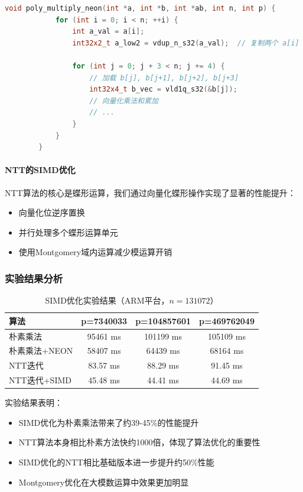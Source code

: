 \documentclass[a4paper]{article}
\begin{document}
	\begin{lstlisting}[language=C++, caption=朴素乘法SIMD优化核心代码]
		void poly_multiply_neon(int *a, int *b, int *ab, int n, int p) {
			for (int i = 0; i < n; ++i) {
				int a_val = a[i];
				int32x2_t a_low2 = vdup_n_s32(a_val);  // 复制两个 a[i]
				
				for (int j = 0; j + 3 < n; j += 4) {
					// 加载 b[j], b[j+1], b[j+2], b[j+3]
					int32x4_t b_vec = vld1q_s32(&b[j]);
					// 向量化乘法和累加
					// ...
				}
			}
		}
	\end{lstlisting}
	
	\paragraph{NTT的SIMD优化}
	NTT算法的核心是蝶形运算，我们通过向量化蝶形操作实现了显著的性能提升：
	
	\begin{itemize}
		\item 向量化位逆序置换
		\item 并行处理多个蝶形运算单元
		\item 使用Montgomery域内运算减少模运算开销
	\end{itemize}
	
	\subsubsection{实验结果分析}
	
	\begin{table}[H]
		\centering
		\caption{SIMD优化实验结果（ARM平台，$n=131072$）}
		\begin{tabular}{|l|c|c|c|}
			\hline
			\textbf{算法} & \textbf{p=7340033} & \textbf{p=104857601} & \textbf{p=469762049} \\
			\hline
			朴素乘法 & 95461 ms & 101199 ms & 105109 ms \\
			\hline
			朴素乘法+NEON & 58407 ms & 64439 ms & 68164 ms \\
			\hline
			NTT迭代 & 83.57 ms & 88.29 ms & 91.45 ms \\
			\hline
			NTT迭代+SIMD & 45.48 ms & 44.41 ms & 44.69 ms \\
			\hline
		\end{tabular}
	\end{table}
	
	实验结果表明：
	\begin{itemize}
		\item SIMD优化为朴素乘法带来了约39-45\%的性能提升
		\item NTT算法本身相比朴素方法快约1000倍，体现了算法优化的重要性
		\item SIMD优化的NTT相比基础版本进一步提升约50\%性能
		\item Montgomery优化在大模数运算中效果更加明显
	\end{itemize}
	
\end{document}
